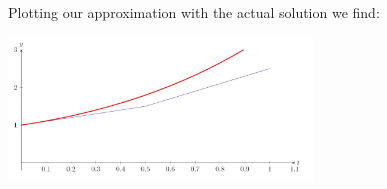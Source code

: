 \documentclass{ximera}
\begin{document}
\begin{example}
Plotting our approximation with the actual solution we find:

\begin{image}
 \includegraphics[height=1.5in]{fig030103.jpg} 
\end{image}

 

\end{example}
\end{document}
